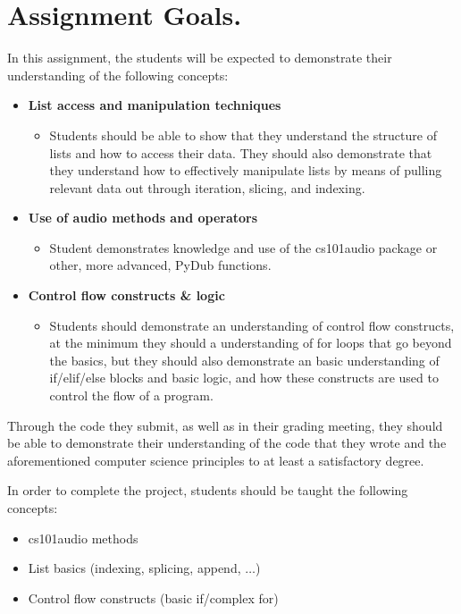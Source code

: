 \documentclass[11pt, letterpaper, onecolumn, oneside, final]{article}
\begin{document}
    \maketitle

\section{Assignment Goals.} 

In this assignment, the students will be expected to demonstrate their understanding of the following concepts:
\begin{itemize}
\item \textbf{List access and manipulation techniques}
\begin{itemize}
\item Students should be able to show that they understand the structure of lists and how
to access their data. They should also demonstrate that they understand how to effectively manipulate lists by means of pulling relevant data out through iteration, slicing, and indexing.
\end{itemize}
\item\textbf{Use of audio methods and operators}
\begin{itemize}
\item Student demonstrates knowledge and use of the {\consolas cs101audio} package or other, more
advanced, {\consolas PyDub} functions.

\end{itemize}
\item \textbf{Control flow constructs \& logic}
\begin{itemize}
\item Students should demonstrate an understanding of control flow constructs, at the minimum they should a understanding of for loops that go beyond the basics, but they should also demonstrate an basic understanding of if/elif/else blocks and basic logic, and how these constructs are used to control the flow of a program.
\end{itemize}
\end{itemize}

Through the code they submit, as well as in their grading meeting, they should be able to demonstrate their understanding of the code that they wrote and the aforementioned computer science principles to at least a satisfactory degree.

In order to complete the project, students should be taught the following concepts:
\begin{itemize}
    \item {\consolas cs101audio} methods
    \item List basics (indexing, splicing, append, $\dots$)
    \item Control flow constructs (basic if/complex for)
\end{itemize}
\end{document}
